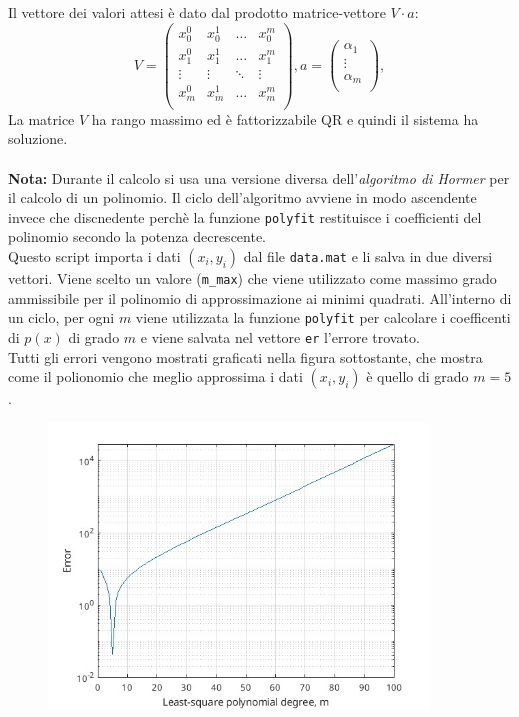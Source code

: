 \documentclass[10pt,a4paper]{article}
\begin{document}
Il vettore dei valori attesi è dato dal prodotto matrice-vettore $V\cdot a$:
$$V = \begin{pmatrix}
x_0^0 & x_0^1 &\dots & x_0^m\\
x_1^0 & x_1^1 &\dots & x_1^m\\
\vdots &\vdots &\ddots &\vdots\\
x_m^0 & x_m^1 &\dots & x_m^m\\
\end{pmatrix}, a=\begin{pmatrix}
  \alpha_{1}\\
  \vdots \\
  \alpha_{m} \\
\end{pmatrix},$$
\pagebreak
La matrice $V$ ha rango massimo ed è fattorizzabile QR e quindi il sistema ha soluzione.\\\\
\textbf{Nota:} Durante il calcolo si usa una versione diversa dell'\textit{algoritmo di Hormer} per il calcolo di un polinomio. Il ciclo dell'algoritmo avviene in modo ascendente invece che discnedente perchè la funzione \texttt{polyfit} restituisce i coefficienti del polinomio secondo la potenza decrescente.\\

Questo script importa i dati $(x_i,y_i)$ dal file \texttt{data.mat} e li salva in due  diversi vettori. Viene scelto un valore (\texttt{m\_max}) che viene utilizzato come massimo grado ammissibile per il polinomio di approssimazione ai minimi quadrati. All'interno di un ciclo, per ogni $m$ viene utilizzata la funzione \texttt{polyfit} per calcolare i coefficenti di $p(x)$ di grado $m$ e viene salvata nel vettore \texttt{er} l'errore trovato.\\Tutti gli errori vengono mostrati graficati nella figura sottostante, che mostra come il polionomio che meglio approssima i dati $(x_i,y_i)$ è quello di grado $m=5$.
\begin{figure}[h!]
  \centering
  \includegraphics[width=0.9\textwidth]{../figure/esercizio_24}  
\end{figure}
\end{document}
